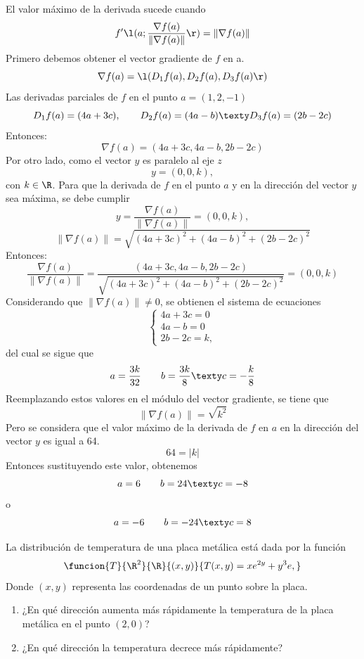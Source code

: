 \documentclass[a4,11pt]{aleph-examen}
\begin{document}
\begin{preguntas}
\begin{respuesta}
\begin{respuesta}
\begin{respuesta}
    El valor máximo de la derivada sucede cuando
    \[
        f'\l(a;\frac{\nabla f(a)}{\|\nabla f(a)\|}\r)=\|\nabla f(a)\|
    \]
    Primero debemos obtener el vector gradiente de $f$ en a. 
    \[
        \nabla f(a)=\l(D_1f(a),D_2f(a),D_3f(a)\r)
    \]
    Las derivadas parciales de $f$ en el punto $a=(1,2,-1)$
    \[
        D_1f(a)=(4a+3c),
        \qquad
        D_2f(a)=(4a-b)
        \texty
        D_3f(a)=(2b-2c)
    \]
    Entonces:
    \[
    \nabla f(a)=(4a+3c,4a-b,2b-2c)
           \]
    Por otro lado, como el vector $y$ es paralelo al eje $z$
    \[
        y=(0,0,k),
    \]
    con $k\in\R$. Para que la derivada de $f$ en el punto $a$ y en la dirección del vector $y$ sea máxima, se debe cumplir
    \[
        y=\frac{\nabla f(a)}{\| \nabla f(a) \|}=(0,0,k),
    \]
    \[
        \|\nabla f(a) \|=\sqrt{(4a+3c)^2+(4a-b)^2+(2b-2c)^2}
    \]
    Entonces:
    \[
        \frac{\nabla f(a)}{\| \nabla f(a)\|}=\frac{(4a+3c,4a-b,2b-2c)}{\sqrt{(4a+3c)^2+(4a-b)^2+(2b-2c)^2}}=(0,0,k)
    \]
    Considerando que $\|\nabla f(a) \| \neq0$, se obtienen el sistema de ecuaciones
    \[
        \begin{cases}
            4a+3c=0 \\
            4a-b=0 \\
            2b-2c=k,
        \end{cases}
    \]
    del cual se sigue que
    \[
        a=\frac{3k}{32}
        \qquad
        b=\frac{3k}{8}
        \texty
        c=-\frac{k}{8}
    \]
    Reemplazando estos valores en el módulo del vector gradiente, se tiene que
    \[
        \| \nabla f(a)\| = \sqrt{k^2} 
    \]
    Pero se considera que el valor máximo de la derivada de $f$ en $a$ en la dirección del vector $y$ es igual a 64.
    \[
        64 = |k|
    \]
    Entonces sustituyendo este valor,  obtenemos
    \[
        a=6
        \qquad
        b=24
        \texty
        c=-8
    \]
    o
    \[
        a=-6
        \qquad
        b=-24
        \texty
        c=8
    \]
    
\end{respuesta}

\item 
    La distribución de temperatura de una placa metálica está dada por la función
	\[
        \funcion{T}{\R^2}{\R}
        {(x,y)}{T(x,y) = xe^{2y} + y^3 e,}
	\]
	Donde $(x,y)$ representa las coordenadas de un punto sobre la placa.
    \begin{enumerate}
        \item ¿En qué dirección aumenta más rápidamente la temperatura de la placa metálica en el punto $(2, 0)$?
        \item ¿En qué dirección la temperatura decrece más rápidamente?
    \end{enumerate}


\end{respuesta}
\end{respuesta}
\end{preguntas}
\end{document}
